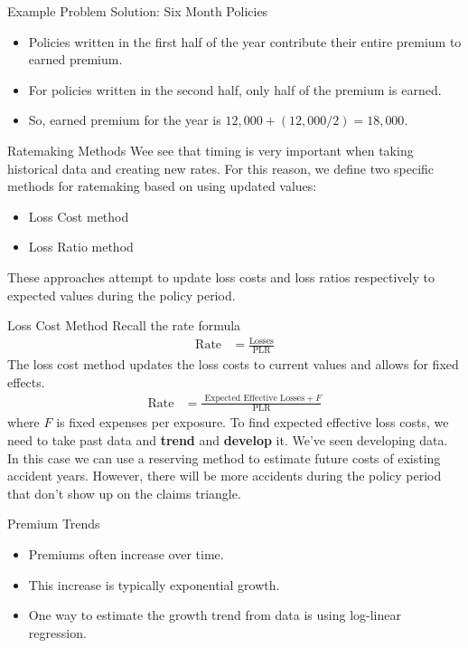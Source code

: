 \documentclass[compress,mathserif]{beamer}
\begin{document}
\begin{frame}{Example Problem Solution: Six Month Policies}
    \begin{itemize}
        \item Policies written in the first half of the year contribute their entire premium to earned premium.
        \item For policies written in the second half, only half of the premium is earned.
        \item So, earned premium for the year is $12,000 + (12,000 / 2) = 18,000$.
    \end{itemize}
\end{frame}


\begin{frame}{Ratemaking Methods}
Wee see that timing is very important when taking historical data and creating new rates. For this reason, we define two specific methods for ratemaking based on using updated values:
\begin{itemize}
\item Loss Cost method
\item Loss Ratio method
\end{itemize}
These approaches attempt to update loss costs and loss ratios respectively to expected values during the policy period. 
\end{frame}

\begin{frame}{Loss Cost Method}
Recall the rate formula
            \begin{align*}
                \text{Rate} &= \frac{\text{Losses}}{\text{PLR}}
            \end{align*}
The loss cost method updates the loss costs to current values and allows for fixed effects. 
         \begin{align*}
                \text{Rate} &= \frac{\text{ Expected Effective Losses} + F}{\text{PLR}}
            \end{align*}
            where $F$ is fixed expenses per exposure. To find  expected effective loss costs, we need to take past data and \textbf{trend} and \textbf{develop} it. We've seen developing data. In this case we can use a reserving method to estimate future costs of existing accident years. However, there will be more accidents during the policy period that don't show up on the claims triangle. 
\end{frame}

\begin{frame}{Premium Trends}
    \begin{itemize}
        \item Premiums often increase over time.
        \item This increase is typically exponential growth.
        \item One way to estimate the growth trend from data is using log-linear regression.
    \end{itemize}
\end{frame}
\end{document}
